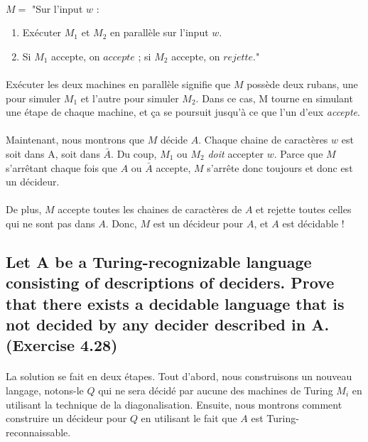 \paragraph{}
$M = $ "Sur l'input $w$ :
\begin{enumerate}
\item Exécuter $M_{1}$ et $M_{2}$ en parallèle sur l'input $w$.
\item Si $M_{1}$ accepte, on $accepte$ ; si $M_{2}$ accepte, on $rejette$."
\end{enumerate}
\paragraph{}
Exécuter les deux machines en parallèle signifie que $M$ possède deux rubans, une pour simuler $M_{1}$ et l'autre pour simuler $M_{2}$. Dans ce cas, M tourne en simulant une étape de chaque machine, et ça se poursuit jusqu'à ce que l'un d'eux \textit{accepte}. 
\paragraph{}
Maintenant, nous montrons que $M$ décide $A$. Chaque chaine de caractères $w$ est soit dans A, soit dans $\bar{A}$. Du coup, $M_{1}$ ou $M_{2}$ \textit{doit} accepter $w$. Parce que $M$ s'arrêtant chaque fois que $A$ ou $\bar{A}$ accepte, $M$ s'arrête donc toujours et donc est un décideur.
\paragraph{}
De plus, $M$ accepte toutes les chaines de caractères de $A$ et rejette toutes celles qui ne sont pas dans $A$. Donc, $M$ est un décideur pour $A$, et $A$ est décidable !

\subsection{Let A be a Turing-recognizable language consisting of descriptions of deciders. Prove that there exists a decidable language that is not decided by any decider described in A. (Exercise 4.28) }

\paragraph{} 
La solution se fait en deux étapes. Tout d'abord, nous construisons un nouveau langage, notons-le $Q$ qui ne sera décidé par aucune des machines de Turing $M_{i}$ en utilisant la technique de la diagonalisation. Ensuite, nous montrons comment construire un décideur pour $Q$ en utilisant le fait que $A$ est Turing-reconnaissable.

